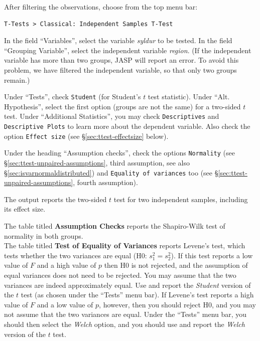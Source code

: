 \documentclass[
]{book}
\begin{document}
After filtering the observations, choose from the top menu bar:

\begin{verbatim}
T-Tests > Classical: Independent Samples T-Test
\end{verbatim}

In the field ``Variables'', select the variable \emph{syldur} to be tested.
In the field ``Grouping Variable'', select the independent variable \emph{region}. (If the independent variable has more than two groups, JASP will report an error. To avoid this problem, we have filtered the independent variable, so that only two groups remain.)

Under ``Tests'', check \texttt{Student} (for Student's \(t\) test statistic). Under ``Alt. Hypothesis'', select the first option (groups are not the same) for a two-sided \(t\) test.
Under ``Additional Statistics'', you may check \texttt{Descriptives} and \texttt{Descriptive\ Plots} to learn more about the dependent variable. Also check the option \texttt{Effect\ size} (see §\ref{sec:ttest-effectsize} below).

Under the heading ``Assumption checks'', check the options \texttt{Normality} (see
§\ref{sec:ttest-unpaired-assumptions}, third assumption, see also\\
§\ref{sec:isvarnormaldistributed}) and \texttt{Equality\ of\ variances} too (see §\ref{sec:ttest-unpaired-assumptions}, fourth assumption).

The output reports the two-sided \(t\) test for two independent samples, including its effect size.

The table titled \textbf{Assumption Checks} reports the Shapiro-Wilk test of normality in both groups.\\
The table titled \textbf{Test of Equality of Variances} reports Levene's test, which tests whether the two variances are equal (H0: \(s^2_1 = s^2_2\)).
If this test reports a low value of \(F\) and a high value of \(p\) then H0 is not rejected, and the assumption of equal variances does not need to be rejected. You may assume that the two variances are indeed approximately equal. Use and report the \emph{Student} version of the \(t\) test (as chosen under the ``Tests'' menu bar).
If Levene's test reports a high value of \(F\) and a low value of \(p\), however, then you should reject H0, and you may not assume that the two variances are equal. Under the ``Tests'' menu bar, you should then select the \emph{Welch} option, and you should use and report the \emph{Welch} version of the \(t\) test.
\end{document}
